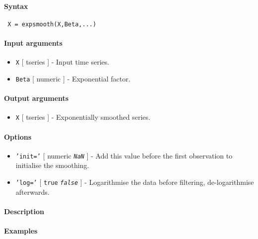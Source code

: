 


	\paragraph{Syntax}
 
 \begin{verbatim}
 X = expsmooth(X,Beta,...)
 \end{verbatim}
 
 \paragraph{Input arguments}
 
 \begin{itemize}
 \item
   \texttt{X} {[} tseries {]} - Input time series.
 \item
   \texttt{Beta} {[} numeric {]} - Exponential factor.
 \end{itemize}
 
 \paragraph{Output arguments}
 
 \begin{itemize}
 \item
   \texttt{X} {[} tseries {]} - Exponentially smoothed series.
 \end{itemize}
 
 \paragraph{Options}
 
 \begin{itemize}
 \item
   \texttt{'init='} {[} numeric \textbar{} \emph{\texttt{NaN}} {]} - Add
   this value before the first observation to initialise the smoothing.
 \item
   \texttt{'log='} {[} \texttt{true} \textbar{} \emph{\texttt{false}} {]}
   - Logarithmise the data before filtering, de-logarithmise afterwards.
 \end{itemize}
 
 \paragraph{Description}
 
 \paragraph{Examples}


